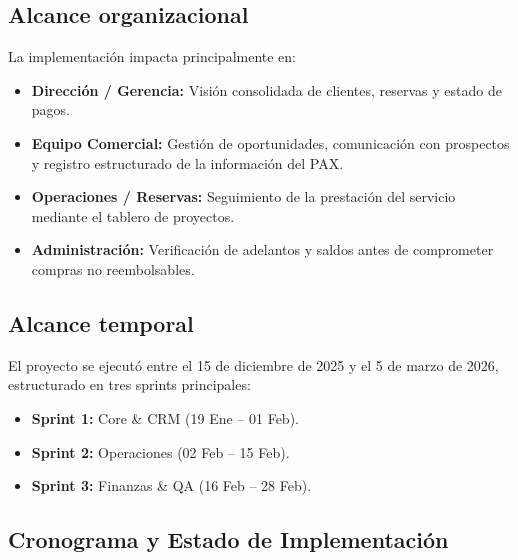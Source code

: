 \subsection{Alcance organizacional}

La implementación impacta principalmente en:

\begin{itemize}
    \item \textbf{Dirección / Gerencia:} Visión consolidada de clientes, reservas y estado de pagos.
    \item \textbf{Equipo Comercial:} Gestión de oportunidades, comunicación con prospectos y registro estructurado de la información del PAX.
    \item \textbf{Operaciones / Reservas:} Seguimiento de la prestación del servicio mediante el tablero de proyectos.
    \item \textbf{Administración:} Verificación de adelantos y saldos antes de comprometer compras no reembolsables.
\end{itemize}

\subsection{Alcance temporal}

El proyecto se ejecutó entre el 15 de diciembre de 2025 y el 5 de marzo de 2026, estructurado en tres sprints principales:

\begin{itemize}
    \item \textbf{Sprint 1:} Core \& CRM (19 Ene -- 01 Feb).
    \item \textbf{Sprint 2:} Operaciones (02 Feb -- 15 Feb).
    \item \textbf{Sprint 3:} Finanzas \& QA (16 Feb -- 28 Feb).
\end{itemize}

\subsection{Cronograma y Estado de Implementación}


